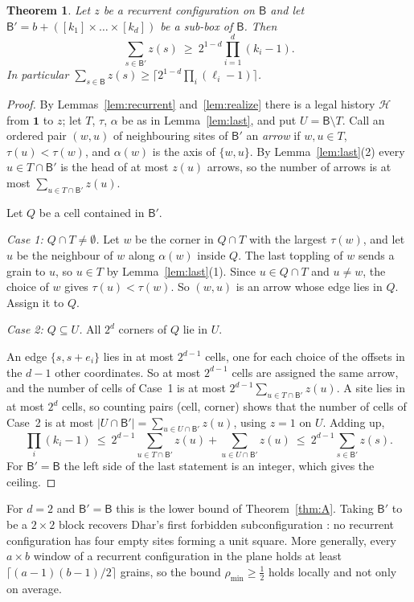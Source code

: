 \documentclass[11pt]{amsart}
\newtheorem{theorem}{Theorem}[section]
\theoremstyle{definition}
\newcommand{\one}{\mathbf 1}
\newcommand{\B}{\mathsf B}
\begin{document}
\begin{theorem}\label{thm:lower}
Let $z$ be a recurrent configuration on $\B$ and let $\B'=b+([k_1]\times\dots\times[k_d])$ be a sub-box of $\B$. Then
\[
\sum_{s\in\B'}z(s)\ \ge\ 2^{1-d}\prod_{i=1}^d(k_i-1).
\]
In particular $\sum_{s\in\B}z(s)\ge\bigl\lceil 2^{1-d}\prod_i(\ell_i-1)\bigr\rceil$.
\end{theorem}

\begin{proof}
By Lemmas~\ref{lem:recurrent} and~\ref{lem:realize} there is a legal history $\mathcal H$ from $\one$ to $z$; let $T$, $\tau$, $\alpha$ be as in Lemma~\ref{lem:last}, and put $U=\B\setminus T$. Call an ordered pair $(w,u)$ of neighbouring sites of $\B'$ an \emph{arrow} if $w,u\in T$, $\tau(u)<\tau(w)$, and $\alpha(w)$ is the axis of $\{w,u\}$. By Lemma~\ref{lem:last}(2) every $u\in T\cap\B'$ is the head of at most $z(u)$ arrows, so the number of arrows is at most $\sum_{u\in T\cap\B'}z(u)$.

Let $Q$ be a cell contained in $\B'$.

\emph{Case 1: $Q\cap T\ne\emptyset$.} Let $w$ be the corner in $Q\cap T$ with the largest $\tau(w)$, and let $u$ be the neighbour of $w$ along $\alpha(w)$ inside $Q$. The last toppling of $w$ sends a grain to $u$, so $u\in T$ by Lemma~\ref{lem:last}(1). Since $u\in Q\cap T$ and $u\neq w$, the choice of $w$ gives $\tau(u)<\tau(w)$. So $(w,u)$ is an arrow whose edge lies in $Q$. Assign it to $Q$.

\emph{Case 2: $Q\subseteq U$.} All $2^d$ corners of $Q$ lie in $U$.

An edge $\{s,s+e_i\}$ lies in at most $2^{d-1}$ cells, one for each choice of the offsets in the $d-1$ other coordinates. So at most $2^{d-1}$ cells are assigned the same arrow, and the number of cells of Case~1 is at most $2^{d-1}\sum_{u\in T\cap\B'}z(u)$. A site lies in at most $2^d$ cells, so counting pairs (cell, corner) shows that the number of cells of Case~2 is at most $|U\cap\B'|=\sum_{u\in U\cap\B'}z(u)$, using $z=1$ on $U$. Adding up,
\[
\prod_i(k_i-1)\ \le\ 2^{d-1}\sum_{u\in T\cap\B'}z(u)+\sum_{u\in U\cap\B'}z(u)\ \le\ 2^{d-1}\sum_{s\in\B'}z(s).
\]
For $\B'=\B$ the left side of the last statement is an integer, which gives the ceiling.
\end{proof}

For $d=2$ and $\B'=\B$ this is the lower bound of Theorem~\ref{thm:A}. Taking $\B'$ to be a $2\times2$ block recovers Dhar's first forbidden subconfiguration \cite[Fig.~1a]{Dha99b}: no recurrent configuration has four empty sites forming a unit square. More generally, every $a\times b$ window of a recurrent configuration in the plane holds at least $\lceil(a-1)(b-1)/2\rceil$ grains, so the bound $\rho_{\min}\ge\tfrac12$ holds locally and not only on average.
\end{document}
